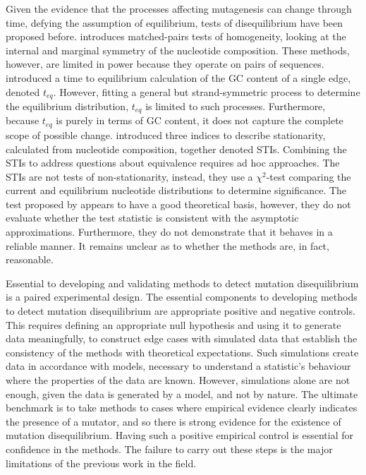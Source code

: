 Given the evidence that the processes affecting mutagenesis can change through time, defying the assumption of equilibrium, tests of disequilibrium have been proposed before. \cite{Ababneh2006Matched-pairsSequences} introduces matched-pairs tests of homogeneity, looking at the internal and marginal symmetry of the nucleotide composition.  These methods, however, are limited in power because they operate on pairs of sequences. \cite{Singh2009StrongDrosophila} introduced a time to equilibrium calculation of the GC content of a single edge, denoted $t_{eq}$. However, fitting a general but strand-symmetric process to determine the equilibrium distribution, $t_{eq}$ is limited to such processes.  Furthermore, because $t_{eq}$ is purely in terms of GC content, it does not capture the complete scope of possible change.  \cite{Squartini2008QuantifyingProcess} introduced three indices to describe stationarity, calculated from nucleotide composition, together denoted STIs. Combining the STIs to address questions about equivalence requires ad hoc approaches. The STIs are not tests of non-stationarity, instead, they use a $\chi^2$-test comparing the current and equilibrium nucleotide distributions to determine significance. The test proposed by \cite{Squartini2008QuantifyingProcess} appears to have a good theoretical basis, however, they do not evaluate whether the test statistic is consistent with the asymptotic approximations. Furthermore, they do not demonstrate that it behaves in a reliable manner. It remains unclear as to whether the methods are, in fact, reasonable. 

Essential to developing and validating methods to detect mutation disequilibrium is a paired experimental design.
The essential components to developing methods to detect mutation disequilibrium are appropriate positive and negative controls. This requires defining an appropriate null hypothesis and using it to generate data meaningfully, to construct edge cases with simulated data that establish the consistency of the methods with theoretical expectations. Such simulations create data in accordance with models, necessary to understand a statistic's behaviour where the properties of the data are known. However, simulations alone are not enough, given the data is generated by a model, and not by nature. The ultimate benchmark is to take methods to cases where empirical evidence clearly indicates the presence of a mutator, and so there is strong evidence for the existence of mutation disequilibrium. Having such a positive empirical control is essential for confidence in the methods. The failure to carry out these steps is the major limitations of the previous work in the field. 

